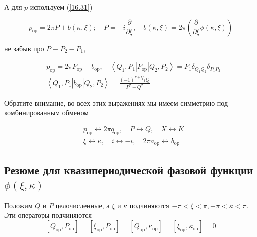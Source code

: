 \documentclass[main.tex]{subfiles}
\begin{document}
А для $p$ используем (\ref{16.31})

\begin{equation}\label{16.39}
	p_{\mathrm{op}}=2 \pi P+b(\kappa, \xi) ; \quad P=-i \frac{\partial}{\partial \xi}, \quad b(\kappa, \xi)=2 \pi\left(\frac{\partial}{\partial \xi} \phi(\kappa, \xi)\right)
\end{equation}

не забыв про $P \equiv P_2 − P_1$,

\begin{equation}\label{16.40}
	\begin{aligned}
&p_{\mathrm{op}}=2 \pi P_{\mathrm{op}}+b_{\mathrm{op}}, \quad\left\langle Q_{1}, P_{1}\left|P_{\mathrm{op}}\right| Q_{2}, P_{2}\right\rangle= P_{1} \delta_{Q_{1} Q_{2}} \delta_{P_{1} P_{2}}\\
&\left\langle Q_{1}, P_{1}\left|b_{\mathrm{op}}\right| Q_{2}, P_{2}\right\rangle=\frac{(-1)^{P+Q} i Q}{P^{2}+Q^{2}}
\end{aligned}
\end{equation}

Обратите внимание, во всех этих выражениях мы имеем симметрию под комбинированным обменом

\begin{equation}\label{16.42}
	\begin{aligned}
&p_{\mathrm{op}} \leftrightarrow 2 \pi q_{\mathrm{op}}, \quad P \leftrightarrow Q, \quad X \leftrightarrow K\\
&\xi \leftrightarrow \kappa, \quad i \leftrightarrow-i, \quad 2 \pi a_{\mathrm{op}} \leftrightarrow b_{\mathrm{op}}
\end{aligned}
\end{equation}





\subsection{Резюме для квазипериодической фазовой функции $\phi(\xi, \kappa)$}\label{ch16.3}

Положим $Q$ и $P$ целочисленные, а $\xi$ и $\kappa$ подчиняются $-\pi<\xi<\pi,-\pi<\kappa<\pi$. Эти операторы подчиняются
\begin{equation}\label{16.} 
\left[Q_{\mathrm{op}}, P_{\mathrm{op}}\right]=\left[\xi_{\mathrm{op}}, P_{\mathrm{op}}\right]=\left[Q_{\mathrm{op}}, \kappa_{\mathrm{op}}\right]=\left[\xi_{\mathrm{op}}, \kappa_{\mathrm{op}}\right]=0
\end{equation}
\end{document}
